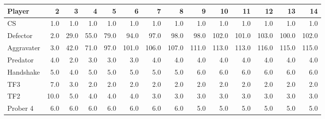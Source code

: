\begin{tabular}{lrrrrrrrrrrrrr}
\toprule
     Player &     2 &     3 &     4 &     5 &      6 &      7 &      8 &      9 &     10 &     11 &     12 &     13 &     14 \\
\midrule
         CS &   1.0 &   1.0 &   1.0 &   1.0 &    1.0 &    1.0 &    1.0 &    1.0 &    1.0 &    1.0 &    1.0 &    1.0 &    1.0 \\
   Defector &   2.0 &  29.0 &  55.0 &  79.0 &   94.0 &   97.0 &   98.0 &   98.0 &  102.0 &  101.0 &  103.0 &  100.0 &  102.0 \\
 Aggravater &   3.0 &  42.0 &  71.0 &  97.0 &  101.0 &  106.0 &  107.0 &  111.0 &  113.0 &  113.0 &  116.0 &  115.0 &  115.0 \\
   Predator &   4.0 &   2.0 &   3.0 &   3.0 &    3.0 &    4.0 &    4.0 &    4.0 &    4.0 &    4.0 &    4.0 &    4.0 &    4.0 \\
  Handshake &   5.0 &   4.0 &   5.0 &   5.0 &    5.0 &    5.0 &    5.0 &    6.0 &    6.0 &    6.0 &    6.0 &    6.0 &    6.0 \\
        TF3 &   7.0 &   3.0 &   2.0 &   2.0 &    2.0 &    2.0 &    2.0 &    2.0 &    2.0 &    2.0 &    2.0 &    2.0 &    2.0 \\
        TF2 &  10.0 &   5.0 &   4.0 &   4.0 &    4.0 &    3.0 &    3.0 &    3.0 &    3.0 &    3.0 &    3.0 &    3.0 &    3.0 \\
   Prober 4 &   6.0 &   6.0 &   6.0 &   6.0 &    6.0 &    6.0 &    6.0 &    5.0 &    5.0 &    5.0 &    5.0 &    5.0 &    5.0 \\
\bottomrule
\end{tabular}
